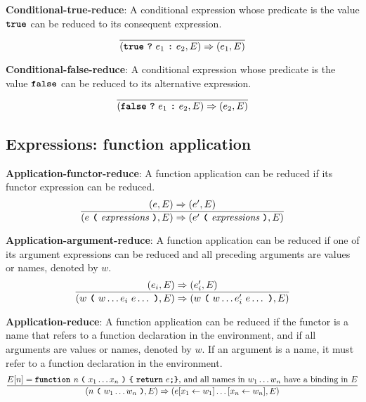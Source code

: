 \vspace{10mm}
\textbf{Conditional-true-reduce}: A conditional
expression whose predicate is the value
$\textbf{\texttt{true}}$
can be reduced to its consequent expression.
\[
\frac{
}{
  (\textbf{\texttt{true}}\  \textbf{\texttt{?}}\ e_1\ \textbf{\texttt{:}}\ e_2, E)
  \Rightarrow
  (e_1, E)
}
\]

\vspace{10mm}
\textbf{Conditional-false-reduce}: A conditional
expression whose predicate is the value
$\textbf{\texttt{false}}$
can be reduced to its alternative expression.
\[
\frac{
}{
  (\textbf{\texttt{false}}\  \textbf{\texttt{?}}\ e_1\ \textbf{\texttt{:}}\ e_2, E)
  \Rightarrow
  (e_2, E)
}
\]


\subsection*{Expressions: function application}

\textbf{Application-functor-reduce}: A function application
can be reduced if its functor expression can be reduced.
\[
\frac{
  ( e , E ) \Rightarrow (e', E)
}{
  (e\  \textbf{\texttt{(}}\ \textit{expressions} \ \textbf{\texttt{)}}, E)
  \Rightarrow
  (e'\  \textbf{\texttt{(}}\ \textit{expressions} \ \textbf{\texttt{)}}, E)
}
\]

\vspace{10mm}
\textbf{Application-argument-reduce}: A function application
can be reduced if one of its argument expressions can be reduced and all
preceding arguments are values or names, denoted by $w$.
\[
\frac{
  ( e_i , E ) \Rightarrow (e_i', E)
}{
  (w\  \textbf{\texttt{(}}\ w \ldots e_i \ e \ldots\ \textbf{\texttt{)}}, E)
  \Rightarrow
  (w\  \textbf{\texttt{(}}\ w \ldots e_i' \ e \ldots\ \textbf{\texttt{)}}, E)
}
\]

\vspace{10mm}
\textbf{Application-reduce}: A function application
can be reduced if the functor is a name that refers to
a function declaration in the environment, and if all
arguments are values or names, denoted by $w$. If an argument
is a name, it must refer to a function declaration in the
environment.
\[
\frac{
  E[n] = \textbf{\texttt{function}}\  \textit{n} \ 
                 \textbf{\texttt{(}}\  x_1 \ldots x_n
                 \ \textbf{\texttt{)}}\ \textbf{\texttt{\{}}\ \textbf{\texttt{return}}\ e \textbf{\texttt{;}} \textbf{\texttt{\}}}
\mbox{, and all names in $w_1 \ldots w_n$ have a binding in $E$}
}{
  (n\  \textbf{\texttt{(}}\ w_1 \ldots w_n\ \textbf{\texttt{)}}, E)
  \Rightarrow
  (e[x_1 \leftarrow w_1]\ldots[x_n \leftarrow w_n], E)
}
\]

    
